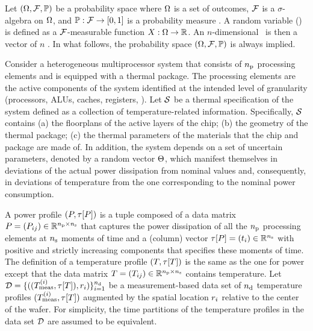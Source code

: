 Let $(\Omega, \mathcal{F}, \mathbb{P})$ be a probability space where $\Omega$ is a set of outcomes, $\mathcal{F}$ is a $\sigma$-algebra on $\Omega$, and $\mathbb{P}: \mathcal{F} \to [0, 1]$ is a probability measure \cite{durrett2010}. A random variable (\rv) is defined as a $\mathcal{F}$-measurable function $X: \Omega \to \mathbb{R}$. An $n$-dimensional \rv\ is then a vector of $n$ \rvs. In what follows, the probability space $(\Omega, \mathcal{F}, \mathbb{P})$ is always implied.

Consider a heterogeneous multiprocessor system that consists of ${n_\text{p}}$ processing elements and is equipped with a thermal package. The processing elements are the active components of the system identified at the intended level of granularity (processors, ALUs, caches, registers, \etc). Let $\mathcal{S}$ be a thermal specification of the system defined as a collection of temperature-related information. Specifically, $\mathcal{S}$ contains (a) the floorplans of the active layers of the chip; (b) the geometry of the thermal package; (c) the thermal parameters of the materials that the chip and package are made of. In addition, the system depends on a set of uncertain parameters, denoted by a random vector $\Theta$, which manifest themselves in deviations of the actual power dissipation from nominal values and, consequently, in deviations of temperature from the one corresponding to the nominal power consumption.

A power profile $\profileP$ is a tuple composed of a data matrix $P = (P_{ij}) \in \mathbb{R}^{{n_\text{p}} \times n_\text{s}}$ that captures the power dissipation of all the ${n_\text{p}}$ processing elements at $n_\text{s}$ moments of time and a (column) vector $\tau[P] = (t_i) \in \mathbb{R}^{n_\text{s}}$ with positive and strictly increasing components that specifies these moments of time. The definition of a temperature profile $\profileT$ is the same as the one for power except that the data matrix $T = (T_{ij}) \in \mathbb{R}^{{n_\text{p}} \times n_\text{s}}$ contains temperature. Let $\mathcal{D} = \{ ((T^{(i)}_{\text{meas}}, \tau[T]), r_i) \}_{i = 1}^{n_\text{d}}$ be a measurement-based data set of $n_\text{d}$ temperature profiles $(T^{(i)}_{\text{meas}}, \tau[T])$ augmented by the spatial location $r_i$ relative to the center of the wafer. For simplicity, the time partitions of the temperature profiles in the data set $\mathcal{D}$ are assumed to be equivalent.


